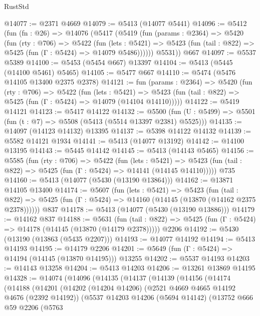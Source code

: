 \begin{lexlean}{RustStd}
\begin{coremodule}
@14077 := @2371 @4669
@14079 := @5413 (@14077 @5441)
@14096 := @5412
    (fun (fn : @26) =>
    @14076
      (@5417
        (@5419
          (fun (params : @2364) =>
          @5420
            (fun (rty : @706) =>
            @5422
              (fun (lets : @5421) =>
              @5423 (fun (tail : @822) => @5425 (fun (Γ : @5424) => @14079 @5486))))))
        @5531))
    @667
@14097 := @5537 @5389
@14100 := @5453 (@5454 @667) @13397
@14104 := @5413 (@5445 (@14100 @5461) @5465)
@14105 := @5477 @667
@14110 := @5474 (@5476 @14105 @13400 @2375 @2378)
@14121 := fun (params : @2364) =>
  @5420
    (fun (rty : @706) =>
    @5422
      (fun (lets : @5421) =>
      @5423 (fun (tail : @822) => @5425 (fun (Γ : @5424) => @14079 (@14104 @14110)))))
@14122 := @5419 @14121
@14123 := @5417 @14122
@14132 := @5500
    (fun (U : @5499) => @5501 (fun (t : @7) => @5508 (@5413 (@5514 @13397 @2381) @5525)))
@14135 := @14097 (@14123 @14132) @13395
@14137 := @5398 @14122 @14132
@14139 := @5582 @14121 @1934
@14141 := @5413 (@14077 @13192)
@14142 := @14100 @13195
@14143 := @5445 @14142
@14145 := @5413 (@14143 @5465)
@14156 := @5585
    (fun (rty : @706) =>
    @5422
      (fun (lets : @5421) =>
      @5423 (fun (tail : @822) => @5425 (fun (Γ : @5424) => @14141 (@14145 @14110)))))
    @735
@14160 := @5413 (@14077 (@5430 (@13190 @13864)))
@14162 := @13871 @14105 @13400
@14174 := @5607
    (fun (lets : @5421) =>
    @5423
      (fun (tail : @822) =>
      @5425 (fun (Γ : @5424) => @14160 (@14145 (@13870 (@14162 @2375 @2378))))))
    @837
@14178 := @5413 (@14077 (@5430 (@13190 @13886)))
@14179 := @14162 @837
@14188 := @5631
    (fun (tail : @822) => @5425 (fun (Γ : @5424) => @14178 (@14145 (@13870 (@14179 @2378)))))
    @2206
@14192 := @5430 (@13190 (@13863 (@5435 @2207)))
@14193 := @14077 @14192
@14194 := @5413 @14193
@14195 := @14179 @2206
@14201 := @5649 (fun (Γ : @5424) => @14194 (@14145 (@13870 @14195))) @13255
@14202 := @5537 @14193
@14203 := @14143 @13258
@14204 := @5413 @14203
@14206 := @13261 @13869 @14195
@14328 := @14074
    (@14096
      (@14135
        (@14137
          (@14139
            (@14156
              (@14174
                (@14188
                  (@14201
                    (@14202
                      (@14204 @14206)
                      (@2521 @4669 @4665 @14192 @4676 (@2392 @14192))
                      (@5537
                        @14203
                        @14206
                        (@5694 @14142)
                        (@13752
                          @666
                          @59
                          @2206
                          (@5763

\end{coremodule}
\end{lexlean}
